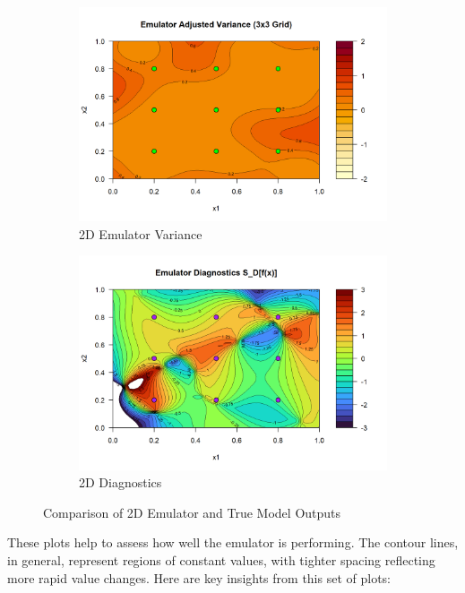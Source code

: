 \documentclass[12pt]{report} %
\begin{document}
\begin{figure}[htbp]
    \begin{subfigure}[b]{0.47\textwidth}
        \centering
        \includegraphics[width=\textwidth]{2D Emulator Variance.png}
        \caption{2D Emulator Variance}
        \label{fig:variance}
    \end{subfigure}
    \hfill
    \begin{subfigure}[b]{0.47\textwidth}
        \centering
        \includegraphics[width=\textwidth]{2D Diagnostics.png}
        \caption{2D Diagnostics}
        \label{fig:diagnostics}
    \end{subfigure}

    \caption{Comparison of 2D Emulator and True Model Outputs}
    \label{fig:comparison}
\end{figure}


\noindent These plots help to assess how well the emulator is performing. The contour lines, in general, represent regions of constant values, with tighter spacing reflecting more rapid value changes. Here are key insights from this set of plots:
\end{document}

